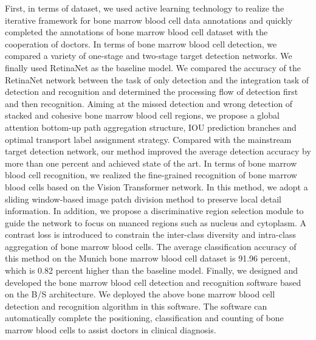\begin{abstract*}
First, in terms of dataset, we used active learning technology to realize the iterative framework for bone marrow blood cell data 
annotations and quickly completed the annotations of bone marrow blood cell dataset with the cooperation of doctors.
In terms of bone marrow blood cell detection, we compared a variety of one-stage and two-stage target detection networks. 
We finally used RetinaNet as the baseline model. We compared the accuracy of the RetinaNet network between the task of only detection and the integration task of detection and recognition
and determined the processing flow of detection first and then recognition.
Aiming at the missed detection and wrong detection of stacked and cohesive bone marrow blood cell regions,
we propose a global attention bottom-up path aggregation structure, IOU prediction branches and optimal transport label assignment strategy.
Compared with the mainstream target detection network, our method
improved the average detection accuracy by more than one percent and achieved state of the art.
In terms of bone marrow blood cell recognition, we realized the fine-grained recognition of bone marrow blood cells based on the Vision Transformer network.
In this method, we adopt a sliding window-based image patch division method to preserve local detail information. 
In addition, we propose a discriminative region selection module to guide the network to focus on nuanced regions such as nucleus and cytoplasm. 
A contrast loss is introduced to constrain the inter-class diversity and intra-class aggregation of bone marrow blood cells.
The average classification accuracy of this method on the Munich bone marrow blood cell dataset is 91.96 percent, 
which is 0.82 percent higher than the baseline model.
Finally, we designed and developed the bone marrow blood cell detection and recognition software based on the B/S architecture.
We deployed the above bone marrow blood cell detection and recognition algorithm in this software. 
The software can automatically complete the positioning, 
classification and counting of bone marrow blood cells to assist doctors in clinical diagnosis.

\end{abstract*}
